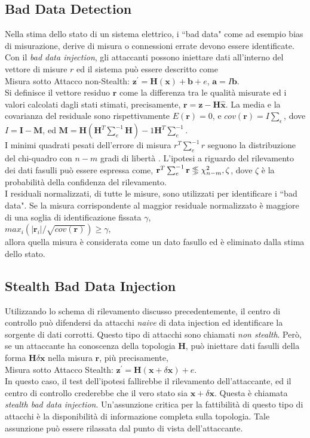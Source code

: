 \subsection{Bad Data Detection}
Nella stima dello stato di un sistema elettrico, i ``bad data" come ad esempio bias di misurazione, derive di misura o connessioni errate devono essere identificate. Con il \emph{bad data injection}, gli attaccanti possono iniettare dati all'interno del vettore di misure $r$ ed il sistema può essere descritto come\\
\indent Misura sotto Attacco non-Stealth: $\textbf{z}^\prime = \textbf{H}(\textbf{x}) + \textbf{b} + e$, $\textbf{a} = I\textbf{b}$.\\
Si definisce il vettore residuo $\textbf{r}$ come la differenza tra le qualità misurate ed i valori calcolati dagli stati stimati, precisamente, $\textbf{r} = \textbf{z} - \textbf{H}\widehat{\textbf{x}}$. La media e la covarianza del residuale sono rispettivamente $E(\textbf{r}) = 0$, e $cov(\textbf{r}) = I\sum_{\epsilon}$, dove $I = \textbf{I} - \textbf{M}$, ed $\textbf{M} = \textbf{H}(\textbf{H}^T\sum_e^{-1}\textbf{H})-1\textbf{H}^T\sum_e^{-1}$.\\
I minimi quadrati pesati dell'errore di misura $r^{T}\sum_{e}^{-1}r$ seguono la distribuzione del chi-quadro con $n - m$ gradi di libertà \cite{monticelli}. L'ipotesi a riguardo del rilevamento dei dati fasulli può essere espressa come, $\textbf{r}^T\sum_{e}^{-1}\textbf{r} \ggll \chi_{n-m}^{2},\zeta$, dove $\zeta$ è la probabilità della confidenza del rilevamento.\\
I residuali normalizzati, di tutte le misure, sono utilizzati per identificare i ``bad data". Se la misura corrispondente al maggior residuale normalizzato è maggiore di una soglia di identificazione fissata $\gamma$, \\
\indent $max_i(|\textbf{r}_i|/\sqrt{cov(\textbf{r})}) \geq \gamma$,\\
allora quella misura è considerata come un dato fasullo ed è eliminato dalla stima dello stato.
\subsection{Stealth Bad Data Injection}
Utilizzando lo schema di rilevamento discusso precedentemente, il centro di controllo può difendersi da attacchi \emph{naive} di data injection ed identificare la sorgente di dati corrotti. Questo tipo di attacchi sono chiamati \emph{non stealth}. Però, se un attaccante ha conoscenza della topologia \textbf{H}, può iniettare dati fasulli della forma $\textbf{H}\delta\textbf{x}$ nella misura $\textbf{r}$, più precisamente,\\
\indent Misura sotto Attacco Stealth: $\textbf{z}^\prime = \textbf{H}(\textbf{x} + \delta\textbf{x}) + e$.\\
In questo caso, il test dell'ipotesi fallirebbe il rilevamento dell'attaccante, ed il centro di controllo crederebbe che il vero stato sia $\textbf{x} + \delta\textbf{x}$. Questa è chiamata \emph{stealth bad data injection}. Un'assunzione critica per la fattibilità di questo tipo di attacchi è la disponibilità di informazione completa sulla topologia. Tale assunzione può essere rilassata dal punto di vista dell'attaccante.
